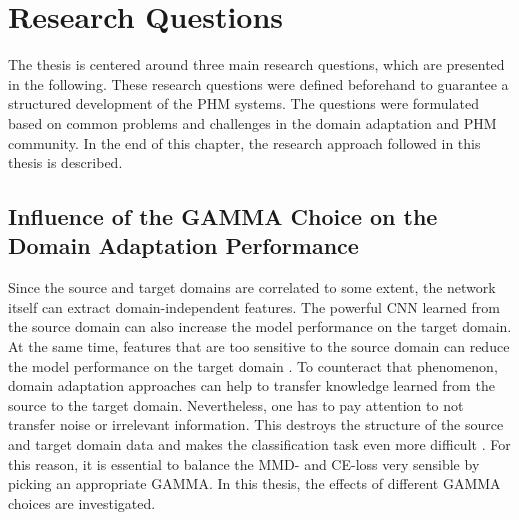 \chapter{Research Questions}\label{chapter:research_approach}
The thesis is centered around three main research questions, which are presented in the following. These research questions were defined beforehand to guarantee a structured development of the PHM systems. The questions were formulated based on common problems and challenges in the domain adaptation and PHM community. In the end of this chapter, the research approach followed in this thesis is described.

\section{Influence of the GAMMA Choice on the Domain Adaptation Performance}
Since the source and target domains are correlated to some extent, the network itself can extract domain-independent features. The powerful CNN learned from the source domain can also increase the model performance on the target domain. At the same time, features that are too sensitive to the source domain can reduce the model performance on the target domain \cite{li2020}. To counteract that phenomenon, domain adaptation approaches can help to transfer knowledge learned from the source to the target domain. Nevertheless, one has to pay attention to not transfer noise or irrelevant information. This destroys the structure of the source and target domain data and makes the classification task even more difficult \cite{li2020}. For this reason, it is essential to balance the MMD- and CE-loss very sensible by picking an appropriate GAMMA. In this thesis, the effects of different GAMMA choices are investigated.

